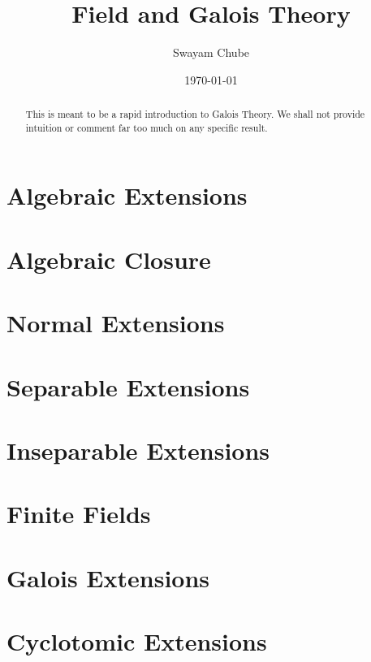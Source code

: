 \documentclass{report}
\title{Field and Galois Theory}
\author{Swayam Chube}
\date{\today}
\begin{document}
\maketitle

\begin{abstract}
    This is meant to be a rapid introduction to Galois Theory. We shall not provide intuition or comment far too much on any specific result.
\end{abstract}

\tableofcontents

\chapter{Algebraic Extensions}
 

\chapter{Algebraic Closure}


\chapter{Normal Extensions}


\chapter{Separable Extensions}


\chapter{Inseparable Extensions}


\chapter{Finite Fields}


\chapter{Galois Extensions}


\chapter{Cyclotomic Extensions}

\end{document}

